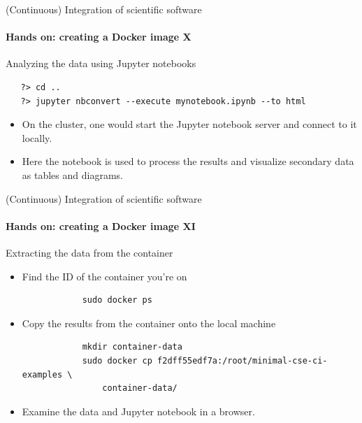 \begin{frame}[fragile]{(Continuous) Integration of scientific software} 
    \framesubtitle{Hands on: creating a Docker image X} 
    \vfill

    Analyzing the data using Jupyter notebooks

\begin{verbatim}
   ?> cd ..
   ?> jupyter nbconvert --execute mynotebook.ipynb --to html 
\end{verbatim}

    \begin{itemize}
        \item On the cluster, one would start the Jupyter notebook server and connect to it locally. 
        \item Here the notebook is used to process the results and visualize secondary data as tables and diagrams.
    \end{itemize}

\end{frame}

\begin{frame}[fragile]{(Continuous) Integration of scientific software} 
    \framesubtitle{Hands on: creating a Docker image XI} 
    \vfill

    Extracting the data from the container 

    \begin{itemize}
        \item Find the ID of the container you're on 
            
            \begin{verbatim}
            sudo docker ps 
            \end{verbatim}

        \item Copy the results from the container onto the local machine 
            \begin{verbatim}
            mkdir container-data
            sudo docker cp f2dff55edf7a:/root/minimal-cse-ci-examples \
                container-data/
            \end{verbatim}
        \item Examine the data and Jupyter notebook in a browser.
    \end{itemize}

\end{frame}

